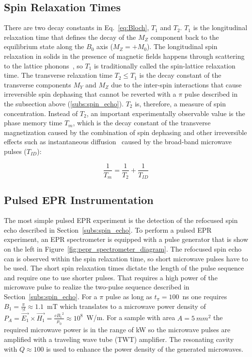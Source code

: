 \subsection{Spin Relaxation Times}
There are two decay constants in Eq.~\ref{eq:Bloch}, $T_1$ and $T_2$. $T_1$ is the longitudinal relaxation time that defines the decay of the $M_Z$ component back to the equilibrium state along the $B_0$ axis ($M_Z = +M_0$). The longitudinal spin relaxation in solids in the presence of magnetic fields happens through scattering to the lattice phonons~\cite{Lunghi2019}, so $T_1$ is traditionally called the spin-lattice relaxation time. The transverse relaxation time $T_2\leq T_1$ is the decay constant of the transverse components $M_Y$ and $M_Z$ due to the inter-spin interactions that cause irreversible spin dephasing that cannot be reverted with a $\pi$ pulse described in the subsection above (\ref{subs:spin_echo}). $T_2$ is, therefore, a measure of spin concentration. Instead of $T_2$, an important experimentally observable value is the phase memory time $T_m$, which is the decay constant of the transverse magnetization caused by the combination of spin dephasing and other irreversible effects such as instantaneous diffusion~\cite{Schweiger2001,Daniel2022} caused by the broad-band microwave pulses ($T_{ID}$):

\begin{equation}
\label{eq:Tm}
\frac{1}{T_m} = \frac{1}{T_2} + \frac{1}{T_{ID}}
\end{equation} 


\subsection{Pulsed EPR Instrumentation}
The most simple pulsed EPR experiment is the detection of the refocused spin echo described in Section~\ref{subs:spin_echo}. To perform a pulsed EPR experiment, an EPR spectrometer is equipped with a pulse generator that is show on the left in Figure~\ref{fig:pepr_spectrometer_diagram}. The refocused spin echo can is observed within the spin relaxation time, so short microwave pulses have to be used. The short spin relaxation times dictate the length of the pulse sequence and require one to use shorter pulses. That requires a high power of the microwave pulse to realize the two-pulse sequence described in Section~\ref{subs:spin_echo}. For a $\pi$ pulse as long as $t_{\pi}=100$~ns one requires $B_1=\frac{\pi}{\gamma t}\approx1.1$~mT which translates to a microwave power density of $P_A=\vec{E_1}\times\vec{H_1}=\frac{c{B_1}^2}{\mu_0}\approx10^8$~W/m. For a sample with area $A=5~mm^2$ the required microwave power is in the range of kW so the microwave pulses are amplified with a traveling wave tube (TWT) amplifier. The resonating cavity with $Q\approx100$ is used to enhance the power density of the generated microwaves.

